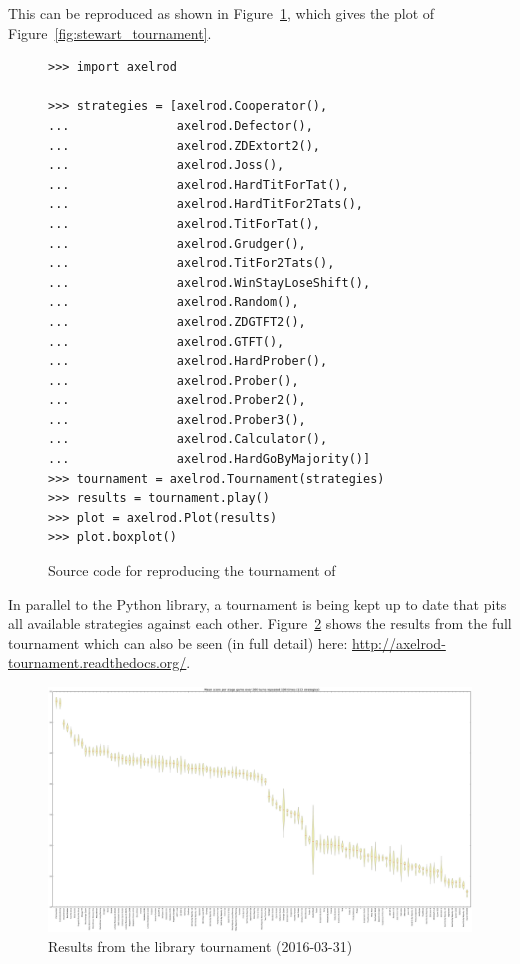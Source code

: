 \documentclass{jors}
\begin{document}
This can be reproduced as shown in Figure~\ref{fig:stewart-code}, which gives
the plot of Figure~\ref{fig:stewart_tournament}.

\begin{figure}[!hbtp]
    \begin{verbatim}
>>> import axelrod

>>> strategies = [axelrod.Cooperator(),
...               axelrod.Defector(),
...               axelrod.ZDExtort2(),
...               axelrod.Joss(),
...               axelrod.HardTitForTat(),
...               axelrod.HardTitFor2Tats(),
...               axelrod.TitForTat(),
...               axelrod.Grudger(),
...               axelrod.TitFor2Tats(),
...               axelrod.WinStayLoseShift(),
...               axelrod.Random(),
...               axelrod.ZDGTFT2(),
...               axelrod.GTFT(),
...               axelrod.HardProber(),
...               axelrod.Prober(),
...               axelrod.Prober2(),
...               axelrod.Prober3(),
...               axelrod.Calculator(),
...               axelrod.HardGoByMajority()]
>>> tournament = axelrod.Tournament(strategies)
>>> results = tournament.play()
>>> plot = axelrod.Plot(results)
>>> plot.boxplot()
    \end{verbatim}
    \caption{Source code for reproducing the tournament of \cite{Stewart2012}}
    \label{fig:stewart-code}
\end{figure}

In parallel to the Python library, a tournament is being kept up to date that
pits all available strategies against each other. Figure~\ref{fig:tournament}
shows the results from the full tournament which can also be seen (in full
detail) here: \url{http://axelrod-tournament.readthedocs.org/}.

\begin{figure}[!hbtp]
	\centering
	\includegraphics[width=.75\textwidth]{../img/tournament.pdf}
	\caption{Results from the library tournament (2016-03-31)}
	\label{fig:tournament}
\end{figure}
\end{document}
